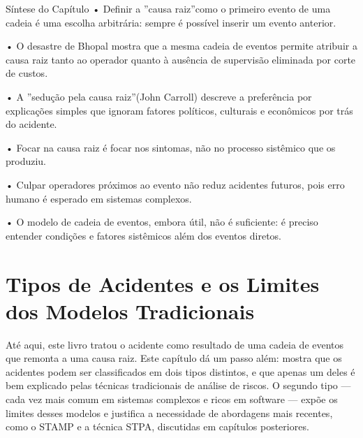 Síntese do Capítulo • Definir a ”causa raiz”como o primeiro evento de uma cadeia é uma escolha arbitrária: sempre é possível inserir um evento anterior.

• O desastre de Bhopal mostra que a mesma cadeia de eventos permite atribuir a causa raiz tanto ao operador quanto à ausência de supervisão eliminada por corte de custos.

• A ”sedução pela causa raiz”(John Carroll) descreve a preferência por explicações simples que ignoram fatores políticos, culturais e econômicos por trás do acidente.

• Focar na causa raiz é focar nos sintomas, não no processo sistêmico que os produziu.

• Culpar operadores próximos ao evento não reduz acidentes futuros, pois erro humano é esperado em sistemas complexos.

• O modelo de cadeia de eventos, embora útil, não é suficiente: é preciso entender condições e fatores sistêmicos além dos eventos diretos.

\chapter{Tipos de Acidentes e os Limites dos Modelos Tradicionais}

Até aqui, este livro tratou o acidente como resultado de uma cadeia de eventos que remonta a uma causa raiz. Este capítulo dá um passo além: mostra que os acidentes podem ser classificados em dois tipos distintos, e que apenas um deles é bem explicado pelas técnicas tradicionais de análise de riscos. O segundo tipo — cada vez mais comum em sistemas complexos e ricos em software — expõe os limites desses modelos e justifica a necessidade de abordagens mais recentes, como o STAMP e a técnica STPA, discutidas em capítulos posteriores.


